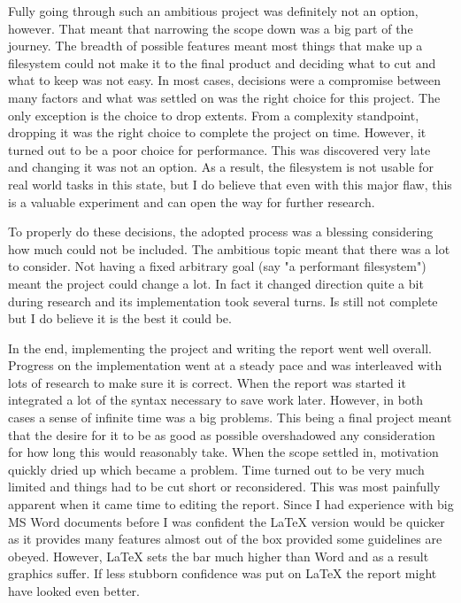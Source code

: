 \begin{appendices}
        Fully going through such an ambitious project was definitely not an
        option, however. That meant that narrowing the scope down was a big
        part of the journey. The breadth of possible features meant most things
        that make up a filesystem could not make it to the final product and
        deciding what to cut and what to keep was not easy. In most cases,
        decisions were a compromise between many factors and what was settled
        on was the right choice for this project. The only exception is the
        choice to drop extents. From a complexity standpoint, dropping it was
        the right choice to complete the project on time. However, it turned
        out to be a poor choice for performance. This was discovered very late
        and changing it was not an option. As a result, the filesystem is not
        usable for real world tasks in this state, but I do believe that even
        with this major flaw, this is a valuable experiment and can open the
        way for further research.

        To properly do these decisions, the adopted process was a blessing
        considering how much could not be included. The ambitious topic meant
        that there was a lot to consider. Not having a fixed arbitrary goal
        (say "a performant filesystem") meant the project could change a lot.
        In fact it changed direction quite a bit during research and its
        implementation took several turns. Is still not complete but I do
        believe it is the best it could be.

        In the end, implementing the project and writing the report went well
        overall. Progress on the implementation went at a steady pace and was
        interleaved with lots of research to make sure it is correct. When the
        report was started it integrated a lot of the syntax necessary to save
        work later. However, in both cases a sense of infinite time was a big
        problems. This being a final project meant that the desire for it to be
        as good as possible overshadowed any consideration for how long this
        would reasonably take. When the scope settled in, motivation quickly
        dried up which became a problem. Time turned out to be very much
        limited and things had to be cut short or reconsidered. This was most
        painfully apparent when it came time to editing the report. Since I had
        experience with big MS Word documents before I was confident the \LaTeX{}
        version would be quicker as it provides many features almost out of the
        box provided some guidelines are obeyed. However, \LaTeX{} sets the bar
        much higher than Word and as a result graphics suffer. If less
        stubborn confidence was put on \LaTeX{} the report might have looked even
        better.


\end{appendices}
